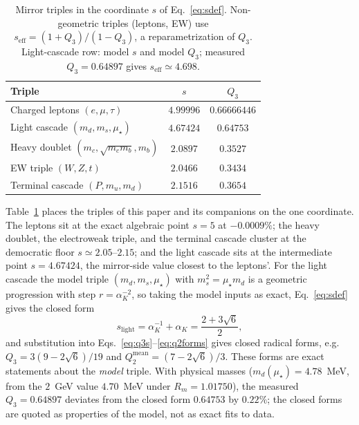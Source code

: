 \documentclass[aps,twocolumn,superscriptaddress,nofootinbib,floatfix]{revtex4-2}
\newcommand{\mstar}{\mu_\star}
\newcommand{\alphaK}{\alpha_K}
\begin{document}
\begin{table}[t]
\centering
\caption{Mirror triples in the coordinate $s$ of Eq.~\eqref{eq:sdef}. Non-geometric triples (leptons, EW) use $s_{\mathrm{eff}}=(1+Q_3)/(1-Q_3)$, a reparametrization of $Q_3$. Light-cascade row: model $s$ and model $Q_3$; measured $Q_3=0.64897$ gives $s_{\mathrm{eff}}\simeq4.698$.}
\label{tab:sladder}
\begin{tabular}{lcc}
\toprule
Triple & $s$ & $Q_3$ \\
\midrule
Charged leptons $(e,\mu,\tau)$ & $4.99996$ & $0.66666446$ \\
Light cascade $(m_d, m_s, \mstar)$ & $4.67424$ & $0.64753$ \\
Heavy doublet $(m_c,\sqrt{m_cm_b},m_b)$ & $2.0897$ & $0.3527$ \\
EW triple $(W, Z, t)$ & $2.0466$ & $0.3434$ \\
Terminal cascade $(P, m_u, m_d)$ & $2.1516$ & $0.3654$ \\
\bottomrule
\end{tabular}
\end{table}

Table~\ref{tab:sladder} places the triples of this paper and its companions on the one coordinate. The leptons sit at the exact algebraic point $s=5$ at $-0.0009\%$; the heavy doublet, the electroweak triple, and the terminal cascade cluster at the democratic floor $s\simeq2.05$--$2.15$; and the light cascade sits at the intermediate point $s=4.67424$, the mirror-side value closest to the leptons'. For the light cascade the model triple $(m_d, m_s, \mstar)$ with $m_s^2=\mstar m_d$ is a geometric progression with step $r=\alphaK^{-2}$, so taking the model inputs as exact, Eq.~\eqref{eq:sdef} gives the closed form
\begin{equation}
s_{\mathrm{light}} = \alphaK^{-1} + \alphaK = \frac{2+3\sqrt{6}}{2},
\label{eq:slightclosed}
\end{equation}
and substitution into Eqs.~\eqref{eq:q3s}--\eqref{eq:q2forms} gives closed radical forms, e.g.\ $Q_3 = 3(9-2\sqrt{6})/19$ and $Q_2^{\mathrm{mean}}=(7-2\sqrt{6})/3$. These forms are exact statements about the \emph{model} triple. With physical masses ($m_d(\mstar)=4.78$~MeV, from the $2$~GeV value $4.70$~MeV under $R_m=1.01750$), the measured $Q_3=0.64897$ deviates from the closed form $0.64753$ by $0.22\%$; the closed forms are quoted as properties of the model, not as exact fits to data.
\end{document}
